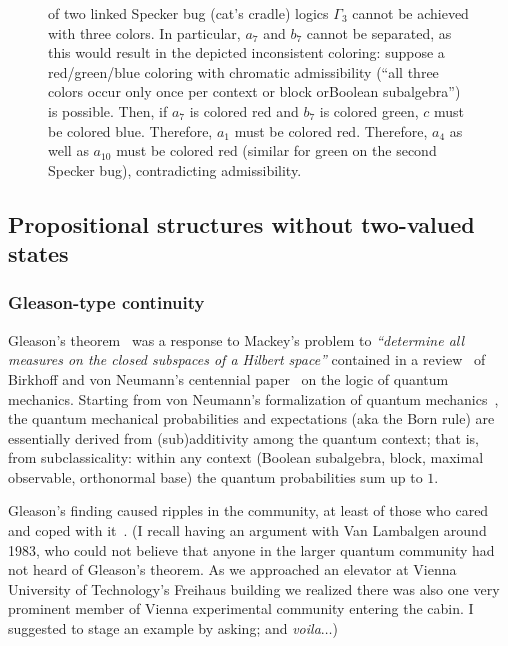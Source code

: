 \documentclass[%
  twocolumn,
 showpacs,
 showkeys,
 preprintnumbers,
 amsmath,amssymb,
 aps,
  pra,
  longbibliography,
 floatfix,
 ]{revtex4-1}
\begin{document}
\begin{figure}
{of two linked Specker bug (cat's cradle) logics $\Gamma_3$ cannot be achieved with three colors.
In particular, $a_7$ and $b_7$ cannot be separated, as this would result in the depicted inconsistent coloring:
suppose a red/green/blue coloring  with chromatic admissibility (``all three colors occur only once per context or block orBoolean subalgebra'')
is possible.
Then, if
$a_7$ is colored red
and
$b_7$ is colored green,
$c$ must be colored blue.
Therefore,
$a_1$ must be colored red.
Therefore,
$a_4$ as well as $a_{10}$
must be colored red (similar for green on the second Specker bug),
contradicting admissibility.
}
\end{figure}




\subsection{Propositional structures without two-valued states}
\label{2017-b-c-lwtvs}




\subsubsection{Gleason-type continuity}
\label{2017-b-c-lwtvs-gleason}

Gleason's theorem~\cite{Gleason} was a response to Mackey's
problem to {\em ``determine all measures on the closed subspaces of a Hilbert space''} contained in a review~\cite{ma-57} of
Birkhoff and von Neumann's centennial paper~\cite{birkhoff-36} on the logic of quantum mechanics.
Starting from von Neumann's formalization of quantum mechanics~\cite{v-neumann-49,v-neumann-55},
the quantum mechanical probabilities and expectations
(aka the Born rule)
are essentially derived from (sub)additivity
among the quantum context; that is, from subclassicality:
within any context (Boolean subalgebra, block, maximal observable, orthonormal base)
the quantum probabilities sum up to $1$.

Gleason's finding caused ripples in the community,
at least of those who cared and coped with
it~\cite{ZirlSchl-65,kamber65,bell-66,kochen1,c-k-m,r:dvur-93,pitowsky:218,rich-bridge}.
(I recall having an argument with Van Lambalgen around 1983, who could not believe that anyone in the larger quantum community
had not heard of Gleason's theorem.
As we approached an elevator at Vienna University of Technology's Freihaus building we realized there was also one very prominent
member of Vienna experimental community entering the cabin.
I suggested to stage an example by asking; and {\em voila}$\ldots$)
\end{document}
